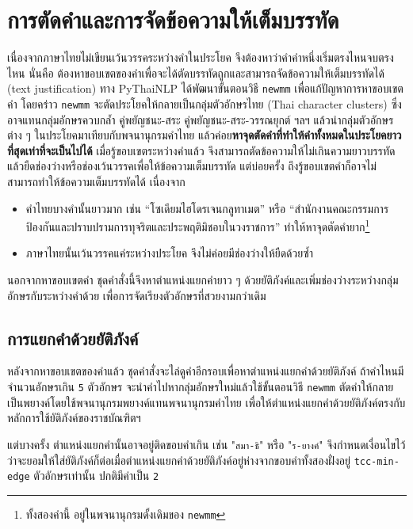 \chapter{การตัดคำและการจัดข้อความให้เต็มบรรทัด}
\label{sec:interword-expansion}

เนื่องจากภาษาไทยไม่เขียนเว้นวรรคระหว่างคำในประโยค
จึงต้องหาว่าคำคำหนึ่งเริ่มตรงไหนจบตรงไหน นั่นคือ
ต้องหาขอบเขตของคำเพื่อจะได้ตัดบรรทัดถูกและสามารถจัดข้อความให้เต็มบรรทัดได้ (text
justification) ทาง PyThaiNLP ได้พัฒนาขั้นตอนวิธี \texttt{newmm}
\parencite{pythainlp-newmm} เพื่อแก้ปัญหาการหาขอบเขตคำ โดยคร่าว \texttt{newmm}
จะตัดประโยคให้กลายเป็นกลุ่มตัวอักษรไทย (Thai character clusters)
ซึ่งอาจแทนกลุ่มอักษรควบกล้ำ คู่พยัญชนะ-สระ คู่พยัญชนะ-สระ-วรรณยุกต์ ฯลฯ
แล้วนำกลุ่มตัวอักษรต่าง ๆ ในประโยคมาเทียบกับพจนานุกรมคำไทย
แล้วค่อย\textbf{หาจุดตัดคำที่ทำให้คำทั้งหมดในประโยคยาวที่สุดเท่าที่จะเป็นไปได้}
เมื่อรู้ขอบเขตระหว่างคำแล้ว จึงสามารถตัดข้อความให้ไม่เกินความยาวบรรทัด
แล้วยืดช่องว่างหรือช่องเว้นวรรคเพื่อให้ข้อความเต็มบรรทัด แต่บ่อยครั้ง
ถึงรู้ขอบเขตคำก็อาจไม่สามารถทำให้ข้อความเต็มบรรทัดได้ เนื่องจาก
\begin{itemize}
  \item คำไทยบางคำนั้นยาวมาก เช่น \enquote{โซเดียมไฮโดรเจนกลูทาเมต} หรือ
        \enquote{สำนักงานคณะกรรมการป้องกันและปราบปรามการทุจริตและประพฤติมิชอบในวงราชการ}
        \hbox{ทำให้}หาจุดตัดคำยาก\footnote{ทั้งสองคำนี้
        อยู่ในพจนานุกรมดั้งเดิมของ \texttt{newmm}}
  \item ภาษาไทยนั้นเว้นวรรคแค่ระหว่างประโยค จึงไม่ค่อยมีช่องว่างให้ยืดด้วยซ้ำ
\end{itemize}
นอกจากหาขอบเขตคำ ชุดคำสั่งนี้จึงหาตำแหน่งแยกคำยาว ๆ
ด้วยยัติภังค์และเพิ่มช่องว่างระหว่างกลุ่มอักษรกับระหว่างคำด้วย
เพื่อการจัดเรียงตัวอักษรที่สวยงามกว่าเดิม

\section{การแยกคำด้วยยัติภังค์}
\label{sec:hyphenation}

หลังจากหาขอบเขตของคำแล้ว
ชุดคำสั่งจะไล่ดูคำอีกรอบเพื่อหาตำแหน่งแยกคำด้วยยัติภังค์
ถ้าคำไหนมีจำนวนอักษรเกิน \texttt{5} ตัวอักษร
จะนำคำไปหากลุ่มอักษรใหม่แล้วใช้ขั้นตอนวิธี \texttt{newmm}
ตัดคำให้กลายเป็นพยางค์โดยใช้พจนานุกรมพยางค์แทนพจนานุกรมคำไทย
เพื่อให้ตำแหน่งแยกคำด้วยยัติภังค์ตรงกับหลักการใช้ยัติภังค์ของราชบัณฑิตฯ
\parencite{hyphenation-orst}

แต่บางครั้ง ตำแหน่งแยกคำนั้นอาจอยู่ติดขอบคำเกิน เช่น \hbox{"\texttt{สมา-ธิ}"}
หรือ \hbox{"\texttt{ร-ยางค์}"}
จึงกำหนดเงื่อนไขไว้ว่าจะยอมให้ใส่ยัติภังค์ก็ต่อเมื่อตำแหน่งแยกคำด้วยยัติภังค์อยู่ห่างจากขอบคำทั้งสองฝั่งอยู่
\texttt{tcc-min-edge} ตัวอักษรเท่านั้น ปกติมีค่าเป็น \texttt{2}

